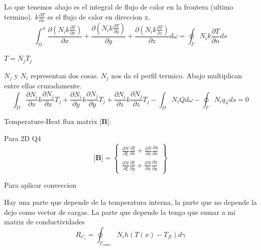 \documentclass[11pt, a4paper,titlepage]{article}
\newcommand{\Mme}[1]{\boldsymbol{[}\mathbf{#1} \boldsymbol{]}}
\newcommand{\MB}{\Mme{B}}
\begin{document}
Lo que tenemos abajo es el integral de flujo de calor en la frontera (ultimo termino). $k \frac{\partial T}{\partial x}$ es el flujo de calor en direccion x.
\[
\int_{\Omega}^{\partial} \frac{\partial\left(N_{i} k \frac{\partial T}{\partial x}\right)}{\partial x}+\frac{\partial\left(N_{i} k \frac{\partial T}{\partial y}\right)}{\partial y}+\frac{\partial\left(N_{i} k \frac{\partial T}{\partial z}\right)}{\partial z} d \omega=\oint_{\Gamma} N_{i} k \frac{\partial T}{\partial \overline{n}} d s
\]

$T=N_j T_j$


$N_j$ y $N_i$ representan dos cosas. $N_j$ nos da el perfil termico. Abajo multiplican entre ellas cruzadamente.
\[
\int_{\Omega} \frac{\partial N_{i}}{\partial x} k \frac{\partial N_{j}}{\partial x} T_{j}+\frac{\partial N_{i}}{\partial y} k \frac{\partial N_{j}}{\partial y} T_{j}+\frac{\partial N_{i}}{\partial z} k \frac{\partial N_{j}}{\partial z} T_{j}-\int_{\Omega} N_{i} Q d \omega-\oint_{\Gamma} N_{i} q_{\vec{n}} d s=0
\]

Temperature-Heat flux matrix $\MB$:


Para 2D Q4
\[
\MB =
\begin{Bmatrix}
\frac{\partial N}{\partial \xi} \frac{\partial \xi}{\partial x} + \frac{\partial N}{\partial \eta} \frac{\partial \eta}{\partial x} \\
 \frac{\partial N}{\partial \xi} \frac{\partial \xi}{\partial y} + \frac{\partial N}{\partial \eta} \frac{\partial \eta}{\partial y} 
\end{Bmatrix}
\]

Para aplicar conveccion 

Hay una parte que depende de la temperatura interna, la parte que no depende la dejo como vector de cargas. La parte que depende la tengo que sumar a mi matriz de conductividades
\[
R_{C_{i}}=\oint_{\Gamma_{c o m v}} N_{i} h\left(T(x)-T_{f l}\right) d \gamma
\]
\end{document}
